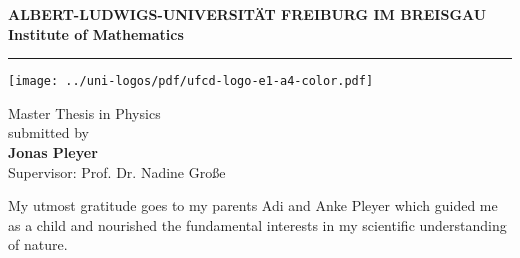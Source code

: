 \begin{titlepage}
\thispagestyle{empty}
\begin{center}
 
\Large\textbf{ALBERT-LUDWIGS-UNIVERSITÄT FREIBURG IM BREISGAU\\}
\vspace{0.5cm}
\Large\textbf{Institute of Mathematics}

\rule{\textwidth}{1pt}
\vspace{1.5cm}

\Large\textbf{\Title}

\vspace{1.5cm}

\texttt{[image: ../uni-logos/pdf/ufcd-logo-e1-a4-color.pdf]}

\vfill

\normalsize
Master Thesis in Physics\\
\vspace{0.5cm}
submitted \Date\hspace{0pt} by\\
\vspace{0.5cm}
\Large\textbf{Jonas Pleyer}\\
\normalsize
\vspace{0.5cm}
\large Supervisor: Prof. Dr. Nadine Große\\
\normalsize

\newpage
\thispagestyle{empty}
\begin{center}
My utmost gratitude goes to my parents Adi and Anke Pleyer which guided me as a child and nourished the fundamental interests in my scientific understanding of nature.
\end{center}

\end{center}

\end{titlepage}
\thispagestyle{empty}

